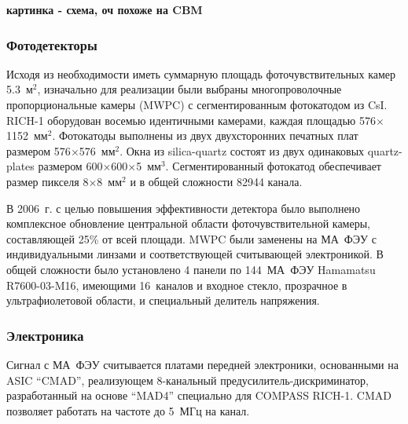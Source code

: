 \todo \textbf{картинка - схема, оч похоже на CBM}

\subsubsection{Фотодетекторы}

Исходя из необходимости иметь суммарную площадь фоточувствительных камер 5.3~м$^2$, изначально для реализации были выбраны многопроволочные пропорциональные камеры (MWPC) с сегментированным фотокатодом из CsI. \mbox{RICH-1} оборудован восемью идентичными камерами, каждая площадью 576$\times$1152~мм$^2$. Фотокатоды выполнены из двух двухсторонних печатных плат размером 576$\times$576~мм$^2$. Окна из silica-quartz состоят из двух одинаковых quartz-plates размером 600$\times$600$\times$5~мм$^3$. Сегментированный фотокатод обеспечивает размер пикселя 8$\times$8~мм$^2$ и в общей сложности 82944 канала.


В 2006~г. с целью повышения эффективности детектора было выполнено комплексное обновление центральной области фоточувствительной камеры, составляющей 25\% от всей площади. MWPC были заменены на МА~ФЭУ с индивидуальными линзами и соответствующей считывающей электроникой. В общей сложности было установлено 4 панели по 144~МА~ФЭУ Hamamatsu R7600-03-M16, имеющими 16~каналов и входное стекло, прозрачное в ультрафиолетовой области, и специальный делитель напряжения.


\subsubsection{Электроника}

Сигнал с МА~ФЭУ считывается платами передней электроники, основанными на ASIC ``CMAD'', реализующем 8-канальный предусилитель-дискриминатор, разработанный на основе ``MAD4'' специально для COMPASS \mbox{RICH-1}. CMAD позволяет работать на частоте до 5~МГц на канал.


